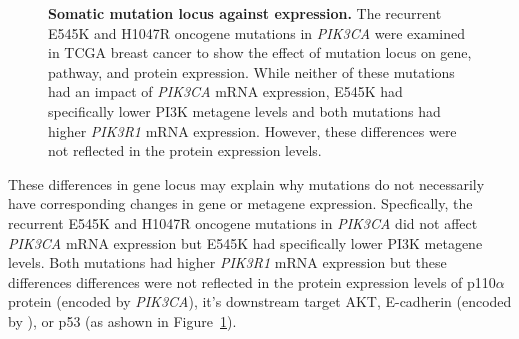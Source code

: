 \begin{figure}[!ht]
\begin{center}
    \end{center}
    \caption[Somatic mutation locus against expression]{\small \textbf{Somatic mutation locus against expression.} The recurrent E545K and H1047R oncogene mutations in \textit{PIK3CA} were examined in TCGA breast cancer to show the effect of mutation locus on gene, pathway, and protein expression. While neither of these mutations had an impact of \textit{PIK3CA} mRNA expression, E545K had specifically lower PI3K \citep{Gatza2011} metagene levels and both mutations had higher \textit{PIK3R1} mRNA expression. However, these differences were not reflected in the protein expression levels.
}
\label{fig:mutation_expr}
\end{figure}

These differences in gene locus may explain why mutations do not necessarily have corresponding changes in gene or metagene expression. Specfically, the recurrent E545K and H1047R oncogene mutations in \textit{PIK3CA} did not affect \textit{PIK3CA} mRNA expression but E545K had specifically lower PI3K \citep{Gatza2011} metagene levels. Both mutations had higher \textit{PIK3R1} mRNA expression but these differences differences were not reflected in the protein expression levels of p110$\alpha$ protein (encoded by \textit{PIK3CA}), it's downstream target AKT, E-cadherin (encoded by ), or p53 (as ashown in Figure~\ref{fig:mutation_expr}).

